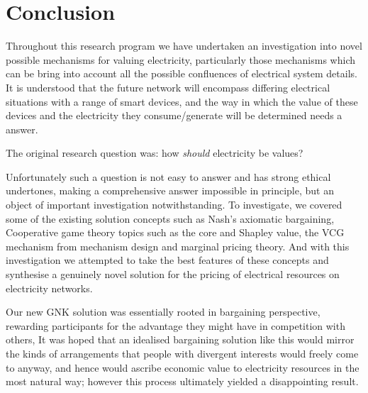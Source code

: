 \chapter{Conclusion}
\label{cha:conc}

Throughout this research program we have undertaken an investigation into novel possible mechanisms for valuing electricity, particularly those mechanisms which can be bring into account all the possible confluences of electrical system details.
It is understood that the future network will encompass differing electrical situations with a range of smart devices, and the way in which the value of these devices and the electricity they consume/generate will be determined needs a answer.

The original research question was: how \textit{should} electricity be values?

Unfortunately such a question is not easy to answer and has strong ethical undertones, making a comprehensive answer impossible in principle, but an object of important investigation notwithstanding.
To investigate, we covered some of the existing solution concepts such as Nash's axiomatic bargaining, Cooperative game theory topics such as the core and Shapley value, the VCG mechanism from mechanism design and marginal pricing theory.
And with this investigation we attempted to take the best features of these concepts and synthesise a genuinely novel solution for the pricing of electrical resources on electricity networks.

Our new GNK solution was essentially rooted in bargaining perspective, rewarding participants for the advantage they might have in competition with others, 
It was hoped that an idealised bargaining solution like this would mirror the kinds of arrangements that people with divergent interests would freely come to anyway, and hence would ascribe economic value to electricity resources in the most natural way; however this process ultimately yielded a disappointing result.


